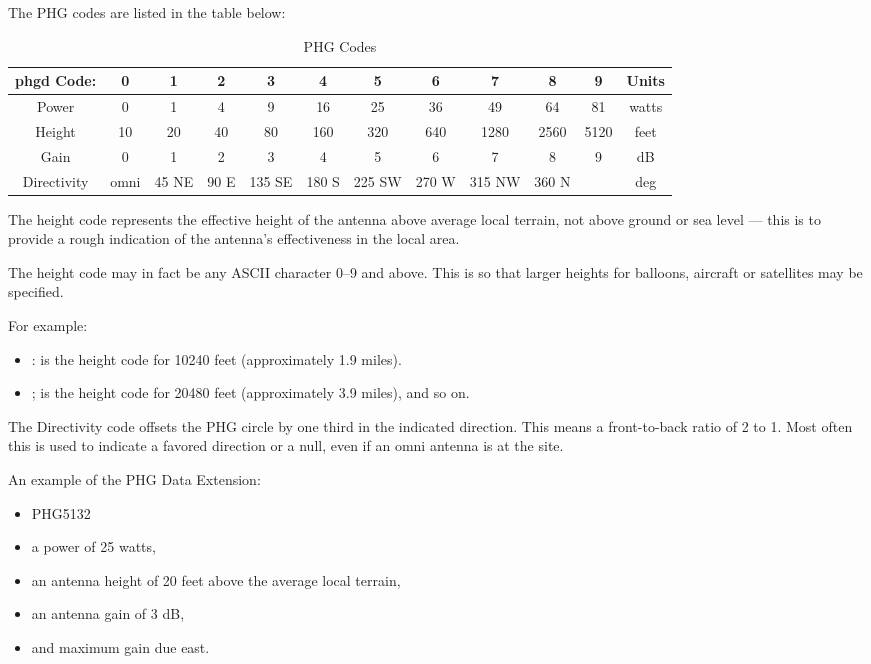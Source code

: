 The PHG codes are listed in the table below:
\begin{table}
  \caption {PHG Codes}
  \begin{tabular}{|c|c|c|c|c|c|c|c|c|c|c|c|}
    \hline      
    phgd Code: & 0 & 1 & 2 & 3 & 4 & 5 & 6 & 7 & 8 & 9 & Units \\
    \hline  
    Power & 0 & 1 & 4 & 9 & 16 & 25 & 36 & 49 & 64 & 81 & watts \\
    \hline  
    Height & 10 & 20 & 40 & 80 & 160 & 320 & 640 & 1280 & 2560 & 5120 & feet \\
    \hline  
    Gain & 0 & 1 & 2 & 3 & 4 & 5 & 6 & 7 & 8 & 9 & dB \\
    \hline  
    Directivity & omni & 45 NE & 90 E & 135 SE & 180 S & 225 SW & 270 W & 315 NW & 360 N & & deg \\
    \hline  
  \end{tabular}
\end{table}



The height code represents the effective height of the antenna above average
local terrain, not above ground or sea level — this is to provide a rough
indication of the antenna’s effectiveness in the local area.

The height code may in fact be any ASCII character 0–9 and above. This is
so that larger heights for balloons, aircraft or satellites may be specified.

For example:
\begin{itemize}
  
\item : is the height code for 10240 feet (approximately 1.9 miles).
\item ; is the height code for 20480 feet (approximately 3.9 miles), and so on.
\end{itemize}

The Directivity code offsets the PHG circle by one third in the indicated
direction. This means a front-to-back ratio of 2 to 1. Most often this is used
to indicate a favored direction or a null, even if an omni antenna is at the site.

An example of the PHG Data Extension:

\begin{itemize}
\item PHG5132
\end{itemize}

\begin{itemize}

\item a power of 25 watts,
\item an antenna height of 20 feet above the average local terrain,
\item an antenna gain of 3 dB,
\item and maximum gain due east.
\end{itemize}


